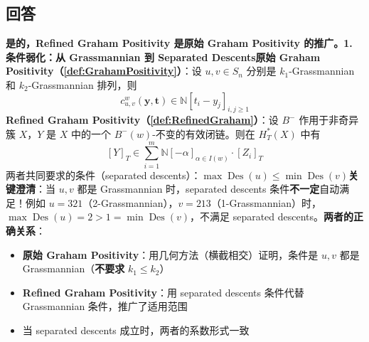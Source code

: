 \subsection{回答}
\textbf{是的，Refined Graham Positivity 是原始 Graham Positivity 的推广。}\textbf{1. 条件弱化：从 Grassmannian 到 Separated Descents}\textbf{原始 Graham Positivity（\cref{def:GrahamPositivity}）}：设 $u, v \in S_n$ 分别是 $k_1$-Grassmannian 和 $k_2$-Grassmannian 排列，则$$c^w_{u,v}(\mathbf{y}, \mathbf{t}) \in \mathbb{N}[t_i - y_j]_{i,j \geq 1}$$\textbf{Refined Graham Positivity（\cref{def:RefinedGraham}）}：设 $B^-$ 作用于非奇异簇 $X$，$Y$ 是 $X$ 中的一个 $B^-(w)$-不变的有效闭链。则在 $H_T^*(X)$ 中有$$[Y]_T \in \sum_{i=1}^m \mathbb{N}[-\alpha]_{\alpha \in I(w)} \cdot [Z_i]_T$$两者共同要求的条件（separated descents）：$\max \operatorname{Des}(u) \leq \min \operatorname{Des}(v)$\textbf{关键澄清}：当 $u, v$ 都是 Grassmannian 时，separated descents 条件\textbf{不一定}自动满足！例如 $u = 321$（2-Grassmannian），$v = 213$（1-Grassmannian）时，$\max \operatorname{Des}(u) = 2 > 1 = \min \operatorname{Des}(v)$，不满足 separated descents。\textbf{两者的正确关系}：
\begin{itemize}
\item \textbf{原始 Graham Positivity}：用几何方法（横截相交）证明，条件是 $u, v$ 都是 Grassmannian（\textbf{不要求} $k_1 \leq k_2$）\item \textbf{Refined Graham Positivity}：用 separated descents 条件代替 Grassmannian 条件，推广了适用范围\item 当 separated descents 成立时，两者的系数形式一致
\end{itemize}

